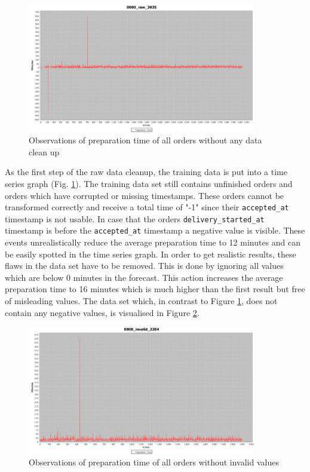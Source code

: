 \begin{figure}[h]
\begin{center}
\includegraphics[width=10cm]{images/0000_raw_3035.png}
\caption{Observations of preparation time of all orders without any data clean up}
\label{fig:0000_raw_3035}
\end{center}
\end{figure}

As the first step of the raw data cleanup, the training data is put into a time series graph (Fig. \ref{fig:0000_raw_3035}). The training data set still contains unfinished orders and orders which have corrupted or missing timestamps. These orders cannot be transformed correctly and receive a total time of "-1" since their \texttt{accepted\_at} timestamp is not usable. In case that the orders \texttt{delivery\_started\_at} timestamp is before the \texttt{accepted\_at} timestamp a negative value is visible. These events unrealistically reduce the average preparation time to 12 minutes and can be easily spotted in the time series graph. In order to get realistic results, these flaws in the data set have to be removed. This is done by ignoring all values which are below 0 minutes in the forecast. This action increases the average preparation time to 16 minutes which is much higher than the first result but free of misleading values. The data set which, in contrast to Figure \ref{fig:0000_raw_3035}, does not contain any negative values, is visualised in Figure \ref{fig:0000_invalid_2204}.

\begin{figure}[h]
\begin{center}
\includegraphics[width=10cm]{images/0000_invalid_2204.png}
\caption{Observations of preparation time of all orders without invalid values}
\label{fig:0000_invalid_2204}
\end{center}
\end{figure}

